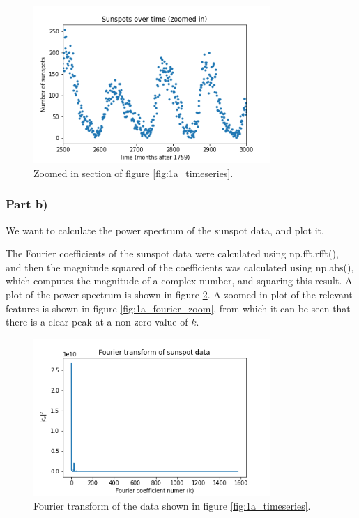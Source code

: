 \documentclass{article}
\begin{document}
\begin{figure}[H]
	\centering
	\includegraphics[width=0.8\textwidth]{../images/1a_timeseries_zoomed.png}
	\caption{Zoomed in section of figure \ref{fig:1a_timeseries}.}
	\label{fig:1a_timeseries_zoom}
\end{figure}

\subsubsection{Part b)}

We want to calculate the power spectrum of the sunspot data, and plot it.

The Fourier coefficients of the sunspot data were calculated using np.fft.rfft(), and then the magnitude squared of the coefficients was calculated using np.abs(), which computes the magnitude of a complex number, and squaring this result. A plot of the power spectrum is shown in figure \ref{fig:1a_fourier}. A zoomed in plot of the relevant features is shown in figure \ref{fig:1a_fourier_zoom}, from which it can be seen that there is a clear peak at a non-zero value of $k$.

\begin{figure}[H]
	\centering
	\includegraphics[width=0.8\textwidth]{../images/1a_fourier.png}
	\caption{Fourier transform of the data shown in figure \ref{fig:1a_timeseries}.}
	\label{fig:1a_fourier}
\end{figure}
\end{document}
